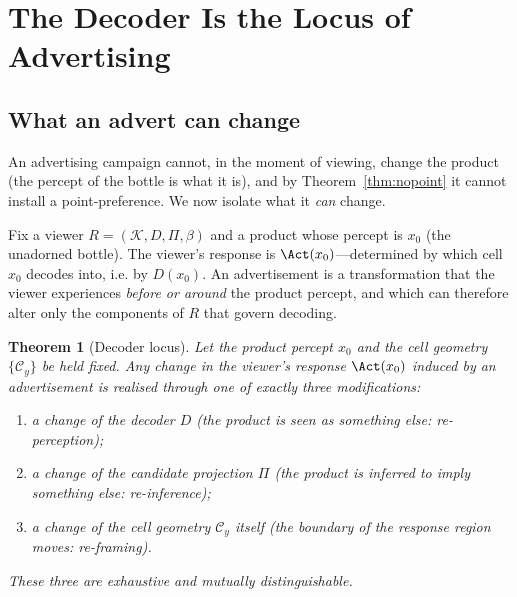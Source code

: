 \documentclass[twocolumn,11pt,a4paper]{article}
\theoremstyle{adv}
\newtheorem{theorem}{Theorem}[section]
\theoremstyle{definition}
\theoremstyle{remark}
\newcommand{\Know}{\mathcal{K}}        %
\newcommand{\Cell}{\mathcal{C}}        %
\newcommand{\Dec}{D}                   %
\newcommand{\Proj}{\Pi}                %
\newcommand{\Recv}{R}                  %
\newcommand{\floor}{\beta}            %
\begin{document}
\section{The Decoder Is the Locus of Advertising}
\label{sec:decoder}

\subsection{What an advert can change}

An advertising campaign cannot, in the moment of viewing, change the
product (the percept of the bottle is what it is), and by
Theorem~\ref{thm:nopoint} it cannot install a point-preference. We now
isolate what it \emph{can} change.

Fix a viewer $\Recv=(\Know,\Dec,\Proj,\floor)$ and a product whose percept
is $x_0$ (the unadorned bottle). The viewer's response is
$\Act(x_0)$---determined by which cell $x_0$ decodes into, i.e. by
$\Dec(x_0)$. An advertisement is a transformation that the viewer
experiences \emph{before or around} the product percept, and which can
therefore alter only the components of $\Recv$ that govern decoding.

\begin{theorem}[Decoder locus]
\label{thm:decoderlocus}
Let the product percept $x_0$ and the cell geometry $\{\Cell_y\}$ be held
fixed. Any change in the viewer's response $\Act(x_0)$ induced by an
advertisement is realised through one of exactly three modifications:
\begin{enumerate}[label=(\alph*),leftmargin=1.8em,itemsep=1pt]
\item a change of the decoder $\Dec$ (the product is \emph{seen as}
  something else: re-perception);
\item a change of the candidate projection $\Proj$ (the product is
  \emph{inferred to imply} something else: re-inference);
\item a change of the cell geometry $\Cell_y$ itself (the boundary of the
  response region moves: re-framing).
\end{enumerate}
These three are exhaustive and mutually distinguishable.
\end{theorem}
\end{document}
